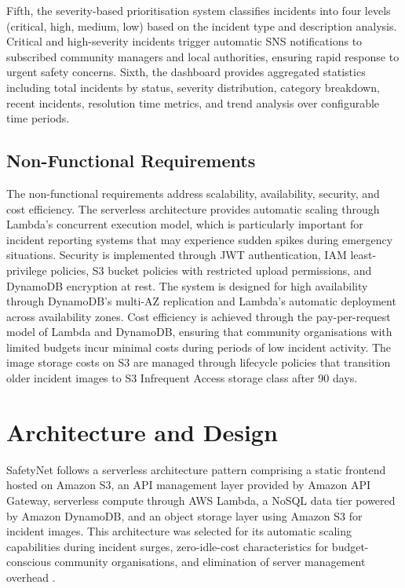 \documentclass[conference]{IEEEtran}
\begin{document}
Fifth, the severity-based prioritisation system classifies incidents into four levels (critical, high, medium, low) based on the incident type and description analysis. Critical and high-severity incidents trigger automatic SNS notifications to subscribed community managers and local authorities, ensuring rapid response to urgent safety concerns. Sixth, the dashboard provides aggregated statistics including total incidents by status, severity distribution, category breakdown, recent incidents, resolution time metrics, and trend analysis over configurable time periods.

\subsection{Non-Functional Requirements}

The non-functional requirements address scalability, availability, security, and cost efficiency. The serverless architecture provides automatic scaling through Lambda's concurrent execution model, which is particularly important for incident reporting systems that may experience sudden spikes during emergency situations. Security is implemented through JWT authentication, IAM least-privilege policies, S3 bucket policies with restricted upload permissions, and DynamoDB encryption at rest. The system is designed for high availability through DynamoDB's multi-AZ replication and Lambda's automatic deployment across availability zones. Cost efficiency is achieved through the pay-per-request model of Lambda and DynamoDB, ensuring that community organisations with limited budgets incur minimal costs during periods of low incident activity. The image storage costs on S3 are managed through lifecycle policies that transition older incident images to S3 Infrequent Access storage class after 90 days.

\section{Architecture and Design}

SafetyNet follows a serverless architecture pattern comprising a static frontend hosted on Amazon S3, an API management layer provided by Amazon API Gateway, serverless compute through AWS Lambda, a NoSQL data tier powered by Amazon DynamoDB, and an object storage layer using Amazon S3 for incident images. This architecture was selected for its automatic scaling capabilities during incident surges, zero-idle-cost characteristics for budget-conscious community organisations, and elimination of server management overhead \cite{serverlesspatterns}.
\end{document}
